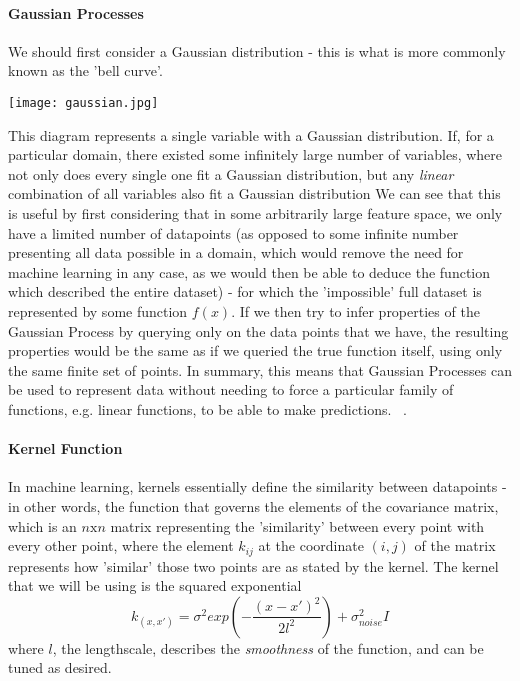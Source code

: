 \documentclass[10pt,sts]{article}
\begin{document}
\begin{multicols}{2}
    \paragraph{Gaussian Processes}

    We should first consider a Gaussian distribution - this is what is more commonly known as the 'bell curve'. 

    \texttt{[image: gaussian.jpg]}

    This diagram represents a single variable with a Gaussian distribution. If, for a particular domain, there existed some infinitely large number of variables, where not only does every single one fit a Gaussian distribution, but any \textit{linear} combination of all variables also fit a Gaussian distribution We can see that this is useful by first considering that in some arbitrarily large feature space, we only have a limited number of datapoints (as opposed to some infinite number presenting all data possible in a domain, which would remove the need for machine learning in any case, as we would then be able to deduce the function which described the entire dataset) - for which the 'impossible' full dataset is represented by some function $f(x)$. If we then try to infer properties of the Gaussian Process by querying only on the data points that we have, the resulting properties would be the same as if we queried the true function itself, using only the same finite set of points. In summary, this means that Gaussian Processes can be used to represent data without needing to force a particular family of functions, e.g. linear functions, to be able to make predictions. ~\citep{rasmussen06}.

    \paragraph{Kernel Function} In machine learning, kernels essentially define the similarity between datapoints - in other words, the function that governs the elements of the covariance matrix, which is an $n \textrm{x} n$ matrix representing the 'similarity' between every point with every other point, where the element $k_{ij}$ at the coordinate $(i,j)$ of the matrix represents how 'similar' those two points are as stated by the kernel. The kernel that we will be using is the squared exponential $$ k_{(x, x')} = \sigma^2 exp\left(-\frac{(x-x')^2}{2l^2}\right) + \sigma^2_{noise}I$$ where $l$, the lengthscale, describes the \textit{smoothness} of the function, and can be tuned as desired.


\end{multicols}
\end{document}
